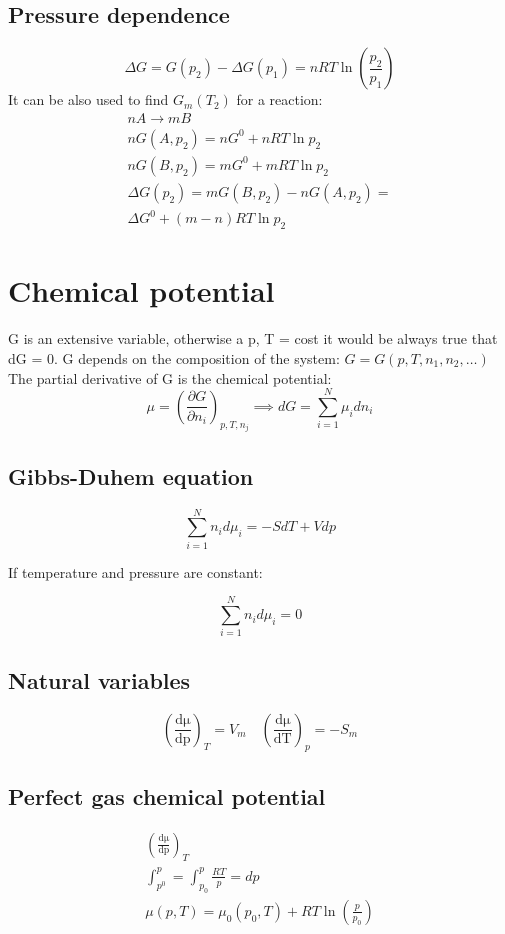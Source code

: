 \documentclass[a4paper]{report}
\begin{document}
\begin{multicols}{2}
    \subsection{Pressure dependence} 
    \[
      \Delta G = G(p_2) - \Delta G(p_1) = nRT\ln \left( \frac{p_2}{p_1} \right)
    \] 
    It can be also used to find \( G_{m}(T_2)  \) for a reaction:
    \begin{gather*}
      nA \to mB \\
      nG(A,p_2) = nG^{0} + nRT\ln p_2 \\
      nG(B,p_2) = mG^{0} + mRT \ln p_2 \\ 
      \Delta G(p_2) = mG(B,p_2) - nG(A,p_2) =\\
      \Delta G^{0} + (m-n)RT\ln p_2   
    \end{gather*}

    \section{Chemical potential}
    G is an extensive variable, otherwise a p, T = cost it would be always true that dG = 0.
    G depends on the composition of the system: \( G = G(p, T, n_{1}, n_{2}, \ldots    ) \) 
    The partial derivative of G is the chemical potential:
    \[
      \mu = \left( \frac{\partial G}{\partial n_{i} }  \right) _{p, T, n_{j}} \implies dG = \sum_{i=1}^{N} \mu _{i}dn_{i}
    \] 

    \subsection{Gibbs-Duhem equation}
    \[
      \sum_{i=1}^{N} n_{i}d\mu _{i}= -SdT + Vdp 
    \] 

    If temperature and pressure are constant:

    \[
      \sum_{i=1}^{N} n_{i}d\mu _{i} = 0  
    \] 
    \subsection{Natural variables}
    \[
      \left( \frac{\mathrm{d\mu }}{\mathrm{dp}}   \right)_{T} = V_{m}  \quad \left( \frac{\mathrm{d\mu }}{\mathrm{dT}}  \right) _{p} = -S_{m}   
    \] 
    \subsection{Perfect gas chemical potential}
    \begin{gather*}
      \left( \frac{\mathrm{d\mu }}{\mathrm{dp}}  \right) _{T}\\
      \int_{p^{0} }^{p} = \int_{p_{0} }^{p} \frac{RT}{p} = dp\\
      \mu (p,T) = \mu _{0}(p_{0},T ) + RT\ln \left( \frac{p}{p_{0} } \right) 
    \end{gather*}

\end{multicols}
\end{document}

